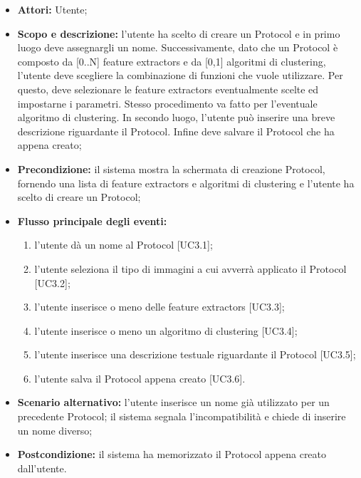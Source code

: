 \begin{itemize}
\item \textbf{Attori:} Utente;
\item \textbf{Scopo e descrizione:} l'utente ha scelto di creare un Protocol\glossario{} e in primo luogo deve assegnargli un nome. Successivamente, dato che un Protocol\glossario{} è composto da [0..N] feature extractors\glossario{} e da [0,1] algoritmi di clustering\glossario{}, l'utente deve scegliere la combinazione di funzioni che vuole utilizzare. Per questo, deve selezionare le feature extractors\glossario{} eventualmente scelte ed impostarne i parametri. Stesso procedimento va fatto per l'eventuale algoritmo di clustering\glossario{}. In secondo luogo, l'utente può inserire una breve descrizione riguardante il Protocol\glossario{}. Infine deve salvare il Protocol\glossario{} che ha appena creato;
\item \textbf{Precondizione:} il sistema mostra la schermata di creazione Protocol\glossario{}, fornendo una lista di feature extractors\glossario{} e algoritmi di clustering\glossario{} e l'utente ha scelto di creare un Protocol\glossario{};
\item \textbf{Flusso principale degli eventi:}
\begin{enumerate}
\item l'utente dà un nome al Protocol\glossario{} [UC3.1];
\item l'utente seleziona il tipo di immagini a cui avverrà applicato il Protocol\glossario{} [UC3.2];
\item l'utente inserisce o meno delle feature extractors\glossario{} [UC3.3];
\item l'utente inserisce o meno un algoritmo di clustering\glossario{} [UC3.4];
\item l'utente inserisce una descrizione testuale riguardante il Protocol\glossario{} [UC3.5];
\item l'utente salva il Protocol\glossario{} appena creato [UC3.6].
\end{enumerate}

\item \textbf{Scenario alternativo:} l'utente inserisce un nome già utilizzato per un precedente Protocol\glossario{}; il sistema segnala l'incompatibilità e chiede di inserire un nome diverso;
\item \textbf{Postcondizione:} il sistema ha memorizzato il Protocol\glossario{} appena creato dall'utente.
\end{itemize}

